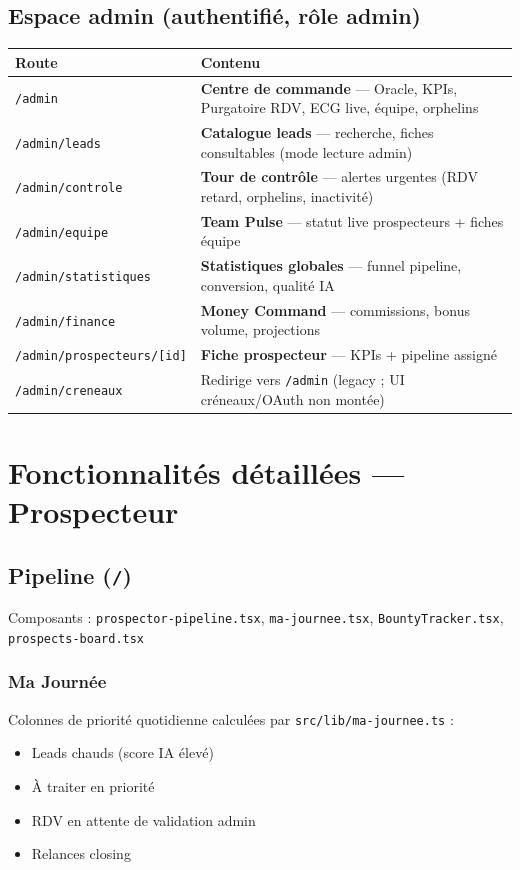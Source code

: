 \documentclass[11pt,a4paper]{report}
\begin{document}
\section{Espace admin (authentifié, rôle admin)}

\begin{longtable}{@{}p{4.5cm}p{9cm}@{}}
\toprule
\textbf{Route} & \textbf{Contenu} \\
\midrule
\endhead
\texttt{/admin} & \textbf{Centre de commande} --- Oracle, KPIs, Purgatoire RDV, ECG live, équipe, orphelins \\
\texttt{/admin/leads} & \textbf{Catalogue leads} --- recherche, fiches consultables (mode lecture admin) \\
\texttt{/admin/controle} & \textbf{Tour de contrôle} --- alertes urgentes (RDV retard, orphelins, inactivité) \\
\texttt{/admin/equipe} & \textbf{Team Pulse} --- statut live prospecteurs + fiches équipe \\
\texttt{/admin/statistiques} & \textbf{Statistiques globales} --- funnel pipeline, conversion, qualité IA \\
\texttt{/admin/finance} & \textbf{Money Command} --- commissions, bonus volume, projections \\
\texttt{/admin/prospecteurs/[id]} & \textbf{Fiche prospecteur} --- KPIs + pipeline assigné \\
\texttt{/admin/creneaux} & Redirige vers \texttt{/admin} (legacy ; UI créneaux/OAuth non montée) \\
\bottomrule
\end{longtable}

\chapter{Fonctionnalités détaillées --- Prospecteur}

\section{Pipeline (\texttt{/})}

Composants : \texttt{prospector-pipeline.tsx}, \texttt{ma-journee.tsx}, \texttt{BountyTracker.tsx}, \texttt{prospects-board.tsx}

\subsection{Ma Journée}
Colonnes de priorité quotidienne calculées par \texttt{src/lib/ma-journee.ts} :
\begin{itemize}[noitemsep]
  \item Leads chauds (score IA élevé)
  \item À traiter en priorité
  \item RDV en attente de validation admin
  \item Relances closing
\end{itemize}
\end{document}

